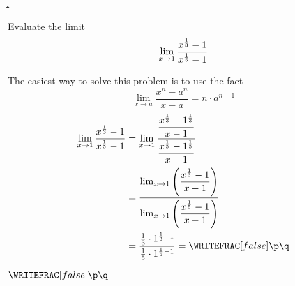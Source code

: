 

\a\b
{}\c\d
{}\vc\p\q

\question[4] Evaluate the limit \[ \lim_{x\to1}\dfrac{x^{\frac{1}{3}}-1}{x^{\frac{1}{5}}-1}\]

\watchout[-30pt]

\begin{solution}[\halfpage]
  The easiest way to solve this problem is to use the fact \[ \lim_{x\to a}\dfrac{x^n-a^n}{x-a} = n\cdot a^{n-1}\]
  \begin{align}
    \lim_{x\to\va}\dfrac{x^{\frac{1}\vb}-1}{x^{\frac{1}\vc}-1} &= 
    \lim_{x\to\va}\dfrac{\dfrac{x^{\frac{1}\vb}-\va^{\frac{1}\vb}}{x-\va}}
    {\dfrac{x^{\frac{1}\vc}-\va^{\frac{1}\vc}}{x-\va}} \\
    &= \dfrac{\lim_{x\to\va}\left(\dfrac{x^{\frac{1}\vb}-\va}{x-\va}\right)}
    {\lim_{x\to\va}\left(\dfrac{x^{\frac{1}{\vc}}-\va}{x-\va} \right)} \\
    &= \dfrac{\frac{1}{\vb}\cdot\va^{\frac{1}\vb - 1}}
    {\frac{1}{\vc}\cdot\va^{\frac{1}{\vc} - 1}} = \WRITEFRAC[false]\p\q
  \end{align}
\end{solution}


\ifprintanswers\begin{codex}$\WRITEFRAC[false]\p\q$\end{codex}\fi
